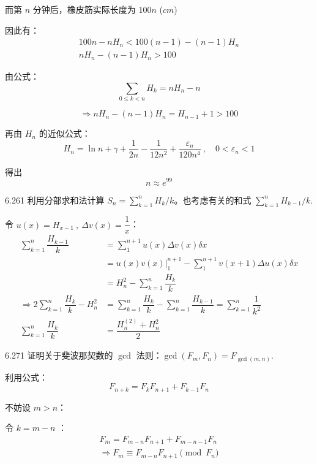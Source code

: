 而第 \( n \) 分钟后，橡皮筋实际长度为 \( 100n \) (\( cm \))

因此有：
\begin{align*}
  100n - n H_n < 100(n-1) - (n-1) H_n \\
  n H_n - (n-1) H_n > 100
\end{align*}

由公式：
\[
  \boxed{\sum_{0 \leqslant k < n} H_k = n H_n - n}
\]

\[
  \Rightarrow n H_n - (n-1) H_n = H_{n-1} + 1 > 100
\]

再由 \( H_n \) 的近似公式：
\[
  \boxed{H_n = \ln{n} + \gamma + \dfrac{1}{2n} - \dfrac{1}{12n^2} + \dfrac{\varepsilon_n}{120n^4} \ , \quad 0 < \varepsilon_n < 1}
\]

得出
\[
  n \approx e^{99}
\]

\begin{problem}{6.26}{1}
  利用分部求和法计算 \( S_n = \sum_{k=1}^n H_k / k \)。也考虑有关的和式 \( \sum_{k=1}^n H_{k-1} / k \).
\end{problem}

令 \( u(x) = H_{x-1} \ , \ \Delta v(x) = \dfrac{1}{x} \)：
\begin{align*}
  \sum_{k=1}^n \dfrac{H_{k-1}}{k} &= \sum_{1}^{n+1} u(x) \Delta v(x) \delta x \\
  &= u(x) v(x) \left. \right|_1^{n+1} - \sum_{1}^{n+1} v(x+1) \Delta u(x) \delta x \\
  &= H_n^2 - \sum_{k=1}^n \dfrac{H_k}{k} \\
  \Rightarrow 2 \sum_{k=1}^n \dfrac{H_k}{k} - H_n^2 &= \sum_{k=1}^n \dfrac{H_k}{k} - \sum_{k=1}^n \dfrac{H_{k-1}}{k} = \sum_{k=1}^n \dfrac{1}{k^2} \\
  \sum_{k=1}^n \dfrac{H_k}{k} &= \dfrac{H_n^{(2)} + H_n^2}{2}
\end{align*}

\begin{problem}{6.27}{1}
  证明关于斐波那契数的 \( \gcd \) 法则：\( \gcd{(F_m, F_n)} = F_{\gcd{(m, n)}} \).
\end{problem}

利用公式：
\[
  \boxed{F_{n+k} = F_k F_{n+1} + F_{k-1} F_n}
\]

不妨设 \( m > n \)：

令 \( k = m-n \) ：
\begin{align*}
  F_m = F_{m-n} F_{n+1} + F_{m-n-1} F_n \\
  \Rightarrow F_m \equiv F_{m-n} F_{n+1} \pmod{F_n}
\end{align*}

